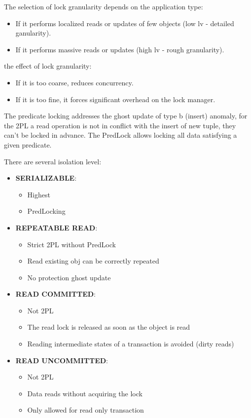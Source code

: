 \documentclass[12pt]{article}
\begin{document}
The selection of lock granularity depends on the application type:
\begin{itemize}
  \item If it performs localized reads or updates of few objects (low lv - detailed ganularity).
  \item If it performs massive reads or updates (high lv - rough granularity).
\end{itemize}
the effect of lock granularity:
\begin{itemize}
  \item If it is too coarse, reduces concurrency.
  \item If it is too fine, it forces significant overhead on the lock manager.
\end{itemize}

The predicate locking addresses the ghost update of type b (insert) anomaly, for the 2PL a read operation is not in conflict with the insert of new tuple, they can't be locked in advance. The PredLock allows locking all data satisfying a given predicate.

There are several isolation level:
\begin{itemize}
  \item \textbf{SERIALIZABLE}:
  \begin{itemize}
    \item Highest
    \item PredLocking
  \end{itemize}
  \item \textbf{REPEATABLE READ}:
  \begin{itemize}
    \item Strict 2PL without PredLock
    \item Read existing obj can be correctly repeated
    \item No protection ghost update
  \end{itemize}
  \item \textbf{READ COMMITTED}:
  \begin{itemize}
    \item Not 2PL
    \item The read lock is released as soon as the object is read
    \item Reading intermediate states of a transaction is avoided (dirty reads)
  \end{itemize}
  \item \textbf{READ UNCOMMITTED}:
  \begin{itemize}
    \item Not 2PL
    \item Data reads without acquiring the lock
    \item Only allowed for read only transaction
  \end{itemize}
\end{itemize}
\end{document}
